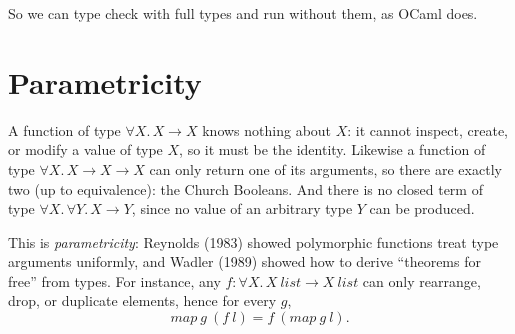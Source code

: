 
So we can type check with full types and run without them, as OCaml does.

\section{Parametricity}

A function of type $\forall X.\, X \to X$ knows nothing about $X$: it cannot inspect,
create, or modify a value of type $X$, so it must be the identity. Likewise a
function of type $\forall X.\, X \to X \to X$ can only return one of its arguments,
so there are exactly two (up to equivalence): the Church Booleans. And there is no
closed term of type $\forall X.\, \forall Y.\, X \to Y$, since no value of an
arbitrary type $Y$ can be produced.

This is \emph{parametricity}: Reynolds (1983) showed polymorphic functions treat
type arguments uniformly, and Wadler (1989) showed how to derive ``theorems for
free'' from types. For instance, any $f : \forall X.\, X\ \mathit{list} \to X\
\mathit{list}$ can only rearrange, drop, or duplicate elements, hence for every $g$,
\[
\mathit{map}\ g\ (f\ l) = f\ (\mathit{map}\ g\ l).
\]
% 
